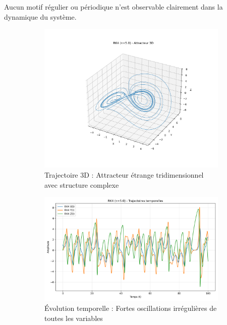 Aucun motif régulier ou périodique n'est observable clairement dans la dynamique du système.
\begin{figure}[H]
    \centering
    \begin{subfigure}[b]{0.5\textwidth}
        \includegraphics[width=\textwidth]{figures/rk4/rk4_tau5.0_3d}
        \caption{Trajectoire 3D : Attracteur étrange tridimensionnel avec structure complexe}
    \end{subfigure}
    \begin{subfigure}[b]{0.4\textwidth}
        \includegraphics[width=\textwidth]{figures/rk4/rk4_tau5.0_time}
        \caption{Évolution temporelle : Fortes oscillations irrégulières de toutes les variables }
    \end{subfigure}
    \begin{subfigure}[b]{0.3\textwidth}

\end{subfigure}
\end{figure}
